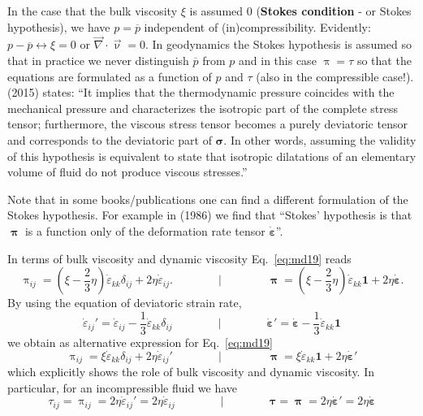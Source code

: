 \begin{remark}
In the case that the bulk viscosity $\xi$ is assumed 0 ({\bf Stokes condition} - or Stokes hypothesis), 
we have $p = \overline{p}$ 
independent of (in)compressibility. Evidently: $p - \overline{p} \leftrightarrow \xi=0$
or $\vec\nabla \cdot \vec\upnu= 0$.
In geodynamics the Stokes hypothesis is assumed so that in practice we never 
distinguish $\overline{p}$ from $p$
and in this case $\uppi=\tau$ so that the equations are formulated as a function 
of $p$ and $\tau$ (also in the 
compressible case!).
\textcite{bure15} (2015) states: ``It implies that the thermodynamic pressure
coincides with the mechanical pressure and characterizes the isotropic part of 
the complete stress tensor; furthermore, the viscous stress tensor becomes a purely 
deviatoric tensor and corresponds to the deviatoric part of ${\bm \sigma}$. 
In other words, assuming the validity of this hypothesis is equivalent to state that isotropic dilatations
of an elementary volume of fluid do not produce viscous stresses.''

Note that in some books/publications one can find a different formulation of the Stokes hypothesis.
For example in \textcite{caod86} (1986) we find that ``Stokes' hypothesis is that ${\bm\uppi}$ is a function
only of the deformation rate tensor $\dot{\bm\varepsilon}$''.
\end{remark}

In terms of bulk viscosity and dynamic viscosity Eq.~\eqref{eq:md19} reads
\begin{equation}
\uppi_{ij} = \left(\xi-\frac23 \eta \right) \dot\varepsilon_{kk} \delta_{ij} + 2\eta \dot\varepsilon_{ij}.
\qquad
\qquad
\bigg\rvert
\qquad
\qquad
{\bm \uppi} = \left(\xi-\frac23 \eta \right) \dot\varepsilon_{kk} {\bm 1} + 2\eta \dot{\bm \varepsilon}.
\label{eq:piij}
\end{equation}
By using the equation of deviatoric strain rate,
\begin{equation}
\dot\varepsilon_{ij}' = \dot\varepsilon_{ij} -\frac13  \dot\varepsilon_{kk} \delta_{ij}
\qquad
\qquad
\bigg\rvert
\qquad
\qquad
\dot{\bm \varepsilon}' = \dot{\bm \varepsilon} - \frac13 \dot\varepsilon_{kk} {\bm 1}
\end{equation}
we obtain as alternative expression for Eq.~\eqref{eq:md19}
\begin{equation}
\uppi_{ij} = \xi  \dot\varepsilon_{kk} \delta_{ij} + 2 \eta \dot\varepsilon_{ij}'
\qquad
\qquad
\bigg\rvert
\qquad
\qquad
{\bm \uppi} = \xi \dot\varepsilon_{kk} {\bm 1} + 2 \eta \dot{\bm \varepsilon}'
\label{eq:md21}
\end{equation}
which explicitly shows the role of bulk viscosity and dynamic viscosity. In particular, for
an incompressible fluid we have
\begin{equation}
\tau_{ij}=\uppi_{ij}=2\eta \dot\varepsilon_{ij}' = 2 \eta \dot\varepsilon_{ij}
\qquad
\qquad
\bigg\rvert
\qquad
\qquad
{\bm \tau} = {\bm \uppi} = 2 \eta \dot{\bm \varepsilon}' = 2 \eta \dot{\bm \varepsilon}
\label{eq:md22}
\end{equation}

